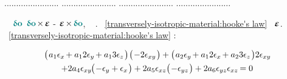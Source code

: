 {{.......................
.......................
.......................
.......................

\vspace{-0.25em}\noindent
{}
~~${ \varvector{\bm{o}} }$
${
   \varvector{\bm{o}}
   \hspace{-.2ex} \times \hspace{-.2ex}
   \infinitesimaldeformation
}$
\hspace{-.1ex} - \hspace{-.1ex}
${
   \infinitesimaldeformation
   \hspace{-.2ex} \times \hspace{-.2ex}
   \varvector{\bm{o}}
}$,
~{}
.
~\eqref{transversely-isotropic-material:hooke's law}
~$\infinitesimaldeformation$.
~\eqref{transversely-isotropic-material:hooke's law}
:

\vspace{-0.25em}\noindent
\begin{gather*}
\bigl( \hspace{.2ex}
a_1 \epsilon_{x} \hspace{-.2ex}
+ a_12 \epsilon_{y} \hspace{-.2ex}
+ a_13 \epsilon_{z} \hspace{.2ex} \bigr) \hspace{.2ex}
\bigl( \hspace{.2ex}
- 2 \epsilon_{xy}
\hspace{.2ex} \bigr)
+ \bigl( \hspace{.2ex}
a_2 \epsilon_{y} \hspace{-.2ex}
+ a_12 \epsilon_{x} \hspace{-.2ex}
+ a_23 \epsilon_{z}
\hspace{.2ex} \bigr)
2 \epsilon_{xy} \hspace{-.2ex}
\\
+ 2 a_4 \epsilon_{xy} \hspace{-.2ex}
\bigl( \hspace{.2ex} - \epsilon_y + \epsilon_x \hspace{.2ex} \bigr)
+ 2 a_5 \epsilon_{xz}
\bigl( \hspace{.2ex} - \epsilon_{yz} \hspace{.2ex} \bigr)
+ 2 a_6 \epsilon_{yz} \epsilon_{xz} \hspace{-.2ex}
= 0
\end{gather*}

}}
